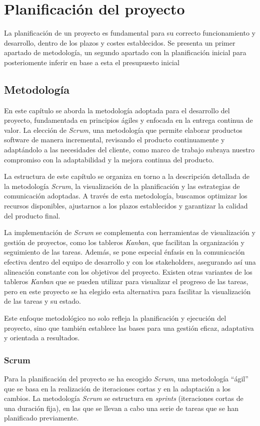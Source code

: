 \chapter{Planificación del proyecto}\label{chap:planif}
La planificación de un proyecto es fundamental para su correcto funcionamiento y desarrollo,
dentro de los plazos y costes establecidos. Se presenta un primer apartado de metodología, un
segundo apartado con la planificación inicial para posteriomente inferir en base a esta el
presupuesto inicial


\section{Metodología}\label{sec:metodología}
En este capítulo se aborda la metodología adoptada para el desarrollo del proyecto, fundamentada
en principios ágiles y enfocada en la entrega continua de valor. La elección de \textit{Scrum},
una metodología que permite elaborar productos software de manera incremental, revisando el
producto continuamente y adaptándolo a las necesidades del cliente, como marco de trabajo subraya
nuestro compromiso con la adaptabilidad y la mejora continua del producto.

La estructura de este capítulo se organiza en torno a la descripción detallada de la metodología
\textit{Scrum}, la visualización de la planificación y las estrategias de comunicación adoptadas.
A través de esta metodología, buscamos optimizar los recursos disponibles, ajustarnos a los plazos
establecidos y garantizar la calidad del producto final.

La implementación de \textit{Scrum} se complementa con herramientas de visualización y gestión de
proyectos, como los tableros \textit{Kanban}, que facilitan la organización y seguimiento de
las tareas. Además, se pone especial énfasis en la comunicación efectiva dentro del equipo de
desarrollo y con los stakeholders, asegurando así una alineación constante con los objetivos del
proyecto. Existen otras variantes de los tableros \textit{Kanban} que se pueden utilizar para
visualizar el progreso de las tareas, pero en este proyecto se ha elegido esta alternativa para
facilitar la visualización de las tareas y su estado.

Este enfoque metodológico no solo refleja la planificación y ejecución del proyecto, sino que
también establece las bases para una gestión eficaz, adaptativa y orientada a resultados.

\newpage{}
\subsection{Scrum}\label{subsec:scrum}
Para la planificación del proyecto se ha escogido \textit{Scrum}, una metodología ``ágil'' que se
basa en la realización de iteraciones cortas y en la adaptación a los cambios. La metodología
\textit{Scrum} se estructura en \textit{sprints} (iteraciones cortas de una duración fija),
en las que se llevan a cabo una serie de tareas que se han planificado previamente.

